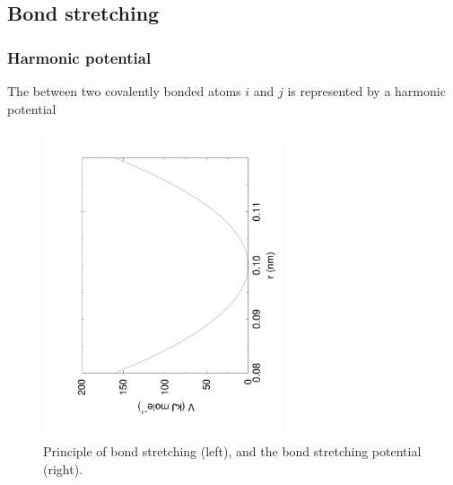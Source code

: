 \subsection{Bond stretching}
\label{sec:bondpot}
\subsubsection{Harmonic potential}
The  between two covalently bonded atoms
$i$ and $j$ is represented by a harmonic potential

\begin{figure}
\centerline{\includegraphics[angle=270,width=7cm]{plots/f_bond}}
\caption[Bond stretching.]{Principle of bond stretching (left), and the bond
stretching potential (right).}
\label{fig:bstretch1}
\end{figure}

